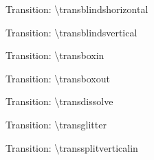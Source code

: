 \documentclass[english,sectioncirclenumberstyle]{ciadbeamer}
\begin{document}

\begin{frame}[c]{Transition: {\textbackslash}transblindshorizontal}
	\transblindshorizontal
	\begin{center}
	\end{center}
\end{frame}

\begin{frame}[c]{Transition: {\textbackslash}transblindsvertical}
	\transblindsvertical
	\begin{center}
	\end{center}
\end{frame}

\begin{frame}[c]{Transition: {\textbackslash}transboxin}
	\transboxin
	\begin{center}
	\end{center}
\end{frame}

\begin{frame}[c]{Transition: {\textbackslash}transboxout}
	\transboxout
	\begin{center}
	\end{center}
\end{frame}

\begin{frame}[c]{Transition: {\textbackslash}transdissolve}
	\transdissolve
	\begin{center}
	\end{center}
\end{frame}

\begin{frame}[c]{Transition: {\textbackslash}transglitter}
	\transglitter
	\begin{center}
	\end{center}
\end{frame}

\begin{frame}[c]{Transition: {\textbackslash}transsplitverticalin}
	\transsplitverticalin
	\begin{center}
	\end{center}
\end{frame}
\end{document}
